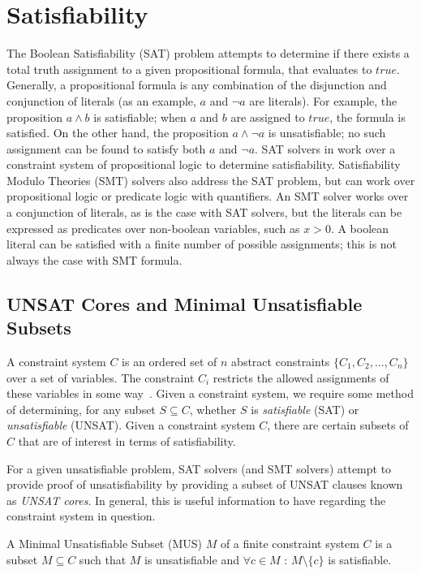 \section{Satisfiability}
\label{sec:sat}
The Boolean Satisfiability (SAT) problem attempts to determine if there exists a total truth assignment to a given propositional formula, that evaluates to $true$. Generally, a propositional formula is any combination of the disjunction and conjunction of literals (as an example, $a$ and $\neg a$ are literals). For example, the proposition $a \land b$ is satisfiable; when $a$ and $b$ are assigned to $true$, the formula is satisfied.  On the other hand, the proposition $a \land \neg a$ is unsatisfiable; no such assignment can be found to satisfy both $a$ and $\neg a$. SAT solvers in work over a constraint system of propositional logic to determine satisfiability. Satisfiability Modulo Theories (SMT) solvers also address the SAT problem, but can work over propositional logic or predicate logic with quantifiers. An SMT solver works over a conjunction of literals, as is the case with SAT solvers, but the literals can be expressed as predicates over non-boolean variables, such as $x > 0$. A boolean literal can be satisfied with a finite number of possible assignments; this is not always the case with SMT formula.

\subsection{UNSAT Cores and Minimal Unsatisfiable Subsets}
A constraint system $C$ is an ordered set of $n$ abstract constraints $\{C_1, C_2, ..., C_n\}$ over a set of variables. The constraint $C_i$ restricts the allowed assignments of these variables in some way~\cite{liffiton2016fast}. Given a constraint system, we require some method of determining, for any subset $S \subseteq C$, whether $S$ is \textit{satisfiable} (SAT) or \textit{unsatisfiable} (UNSAT). Given a constraint system $C$, there are certain subsets of $C$ that are of interest in terms of satisfiability. %

For a given unsatisfiable problem, SAT solvers (and SMT solvers) attempt to provide proof of unsatisfiability by providing a subset of UNSAT clauses known as \textit{UNSAT cores}. In general, this is useful information to have regarding the constraint system in question. 

\begin{definition} A Minimal Unsatisfiable Subset (MUS) $M$ of a finite constraint system $C$ is a subset $M \subseteq C$ such that $M$ is unsatisfiable and $\forall c \in M$ : $M \setminus \{c\}$ is satisfiable. 
\end{definition}

